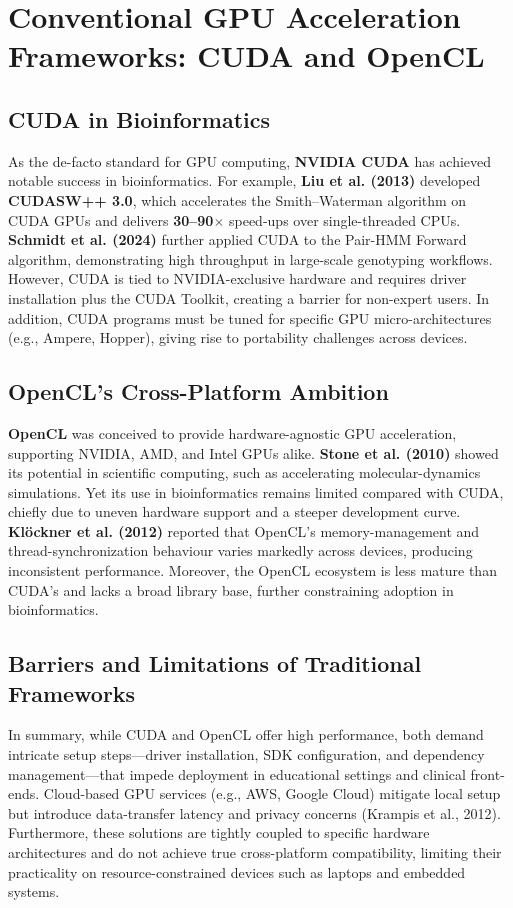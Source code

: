 \documentclass[PhD]{PHlab-thesis}
\begin{document}
\section{Conventional GPU Acceleration Frameworks: CUDA and OpenCL}
\subsection{CUDA in Bioinformatics}
As the de-facto standard for GPU computing, \textbf{NVIDIA CUDA} has achieved notable success in bioinformatics. For example, \textbf{Liu et al. (2013)} developed \textbf{CUDASW++ 3.0}, which accelerates the Smith–Waterman algorithm on CUDA GPUs and delivers \textbf{30–90$\times$} speed-ups over single-threaded CPUs. \textbf{Schmidt et al. (2024)} further applied CUDA to the Pair-HMM Forward algorithm, demonstrating high throughput in large-scale genotyping workflows. However, CUDA is tied to NVIDIA-exclusive hardware and requires driver installation plus the CUDA Toolkit, creating a barrier for non-expert users. In addition, CUDA programs must be tuned for specific GPU micro-architectures (e.g., Ampere, Hopper), giving rise to portability challenges across devices.

\subsection{OpenCL’s Cross-Platform Ambition}
\textbf{OpenCL} was conceived to provide hardware-agnostic GPU acceleration, supporting NVIDIA, AMD, and Intel GPUs alike. \textbf{Stone et al. (2010)} showed its potential in scientific computing, such as accelerating molecular-dynamics simulations. Yet its use in bioinformatics remains limited compared with CUDA, chiefly due to uneven hardware support and a steeper development curve. \textbf{Klöckner et al. (2012)} reported that OpenCL’s memory-management and thread-synchronization behaviour varies markedly across devices, producing inconsistent performance. Moreover, the OpenCL ecosystem is less mature than CUDA’s and lacks a broad library base, further constraining adoption in bioinformatics.

\subsection{Barriers and Limitations of Traditional Frameworks}
In summary, while CUDA and OpenCL offer high performance, both demand intricate setup steps—driver installation, SDK configuration, and dependency management—that impede deployment in educational settings and clinical front-ends. Cloud-based GPU services (e.g., AWS, Google Cloud) mitigate local setup but introduce data-transfer latency and privacy concerns (Krampis et al., 2012). Furthermore, these solutions are tightly coupled to specific hardware architectures and do not achieve true cross-platform compatibility, limiting their practicality on resource-constrained devices such as laptops and embedded systems.
\end{document}
